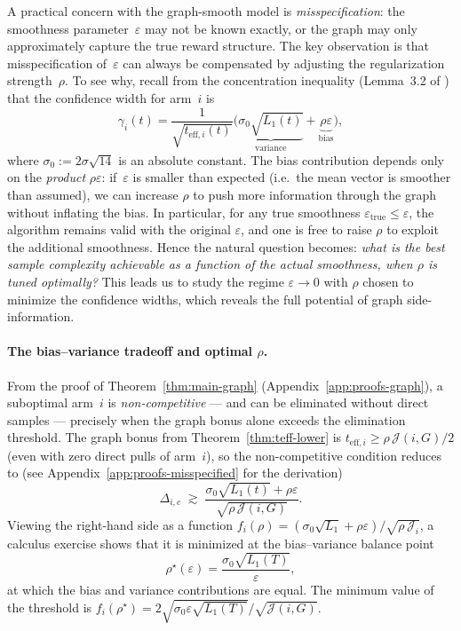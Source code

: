 \documentclass{article}
\begin{document}
A practical concern with the graph-smooth model is \emph{misspecification}:
the smoothness parameter~$\varepsilon$ may not be known exactly, or the graph
may only approximately capture the true reward structure.
The key observation is that misspecification of~$\varepsilon$ can always be
compensated by adjusting the regularization strength~$\rho$.
To see why, recall from the concentration inequality (Lemma~3.2 of
\citealt{thaker2022maximizing}) that the confidence width for arm~$i$ is
\[
\gamma_i(t)
=
\frac{1}{\sqrt{t_{\mathrm{eff},i}(t)}}
\bigl(\underbrace{\sigma_0\sqrt{L_1(t)}}_{\text{variance}}
+\underbrace{\rho\varepsilon}_{\text{bias}}\bigr),
\]
where $\sigma_0:=2\sigma\sqrt{14}$ is an absolute constant.
The bias contribution depends only on the \emph{product} $\rho\varepsilon$:
if~$\varepsilon$ is smaller than expected (i.e.\ the mean vector is smoother
than assumed), we can increase $\rho$ to push more information through the
graph without inflating the bias.
In particular, for any true smoothness $\varepsilon_{\mathrm{true}} \le
\varepsilon$, the algorithm remains valid with the original $\varepsilon$, and
one is free to raise $\rho$ to exploit the additional smoothness.
Hence the natural question becomes: \emph{what is the best sample complexity
achievable as a function of the actual smoothness, when $\rho$ is tuned
optimally?}
This leads us to study the regime $\varepsilon\to 0$ with $\rho$ chosen to
minimize the confidence widths, which reveals the full potential of graph
side-information.

\paragraph{The bias--variance tradeoff and optimal $\rho$.}
From the proof of
Theorem~\ref{thm:main-graph} (Appendix~\ref{app:proofs-graph}), a suboptimal
arm~$i$ is \emph{non-competitive} --- and can be eliminated without direct
samples --- precisely when the graph bonus alone exceeds the elimination
threshold. The graph bonus from Theorem~\ref{thm:teff-lower} is
$t_{\mathrm{eff},i}\ge\rho\,\mathcal J(i,G)/2$ (even with zero direct pulls of
arm~$i$), so the non-competitive condition reduces to (see
Appendix~\ref{app:proofs-misspecified} for the derivation)
\begin{equation}
\label{eq:noncomp-threshold}
\Delta_{i,c}
\;\gtrsim\;
\frac{\sigma_0\sqrt{L_1(t)}+\rho\varepsilon}
     {\sqrt{\rho\,\mathcal J(i,G)}}.
\end{equation}
Viewing the right-hand side as a function
$f_i(\rho)=(\sigma_0\sqrt{L_1}+\rho\varepsilon)/\sqrt{\rho\,\mathcal J_i}$, a
calculus exercise shows that it is minimized at the bias--variance balance point
\begin{equation}
\label{eq:rho-star}
\rho^\star(\varepsilon)
=
\frac{\sigma_0\sqrt{L_1(T)}}{\varepsilon},
\end{equation}
at which the bias and variance contributions are equal. The minimum value of the
threshold is
$
f_i(\rho^\star)
=
{2\sqrt{\sigma_0\varepsilon\sqrt{L_1(T)}}}\big/{\sqrt{\mathcal J(i,G)}}.
$
\end{document}
